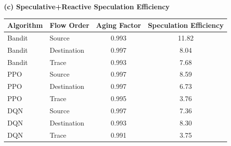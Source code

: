 \begin{table}[t]
\vspace{0.8em}
\textbf{(c) Speculative+Reactive Speculation Efficiency}\\[0.4em]
\begin{tabular}{@{}llcc@{}}
\toprule
Algorithm & Flow Order & Aging Factor & Speculation Efficiency \\
\midrule
Bandit & Source & 0.993 & 11.82 \\
Bandit & Destination & 0.997 & 8.04 \\
Bandit & Trace & 0.993 & 7.68 \\
PPO & Source & 0.997 & 8.59 \\
PPO & Destination & 0.997 & 6.73 \\
PPO & Trace & 0.995 & 3.76 \\
DQN & Source & 0.997 & 7.36 \\
DQN & Destination & 0.993 & 8.30 \\
DQN & Trace & 0.991 & 3.75 \\
\bottomrule
\end{tabular}
\end{table}
